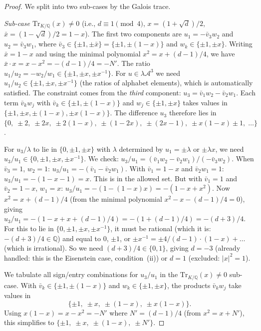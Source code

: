 \documentclass[12pt,a4paper]{article}
\newcommand{\Q}{\mathbb{Q}}
\newcommand{\Tr}[1]{\mathrm{Tr}_{K/\Q}\!\left(#1\right)}
\begin{document}
\begin{proof}
We split into two sub-cases by the Galois trace.

\emph{Sub-case $\Tr{x} \neq 0$} (i.e., $d \equiv 1 \pmod{4}$,
$x = (1{+}\sqrt{d})/2$, $\bar{x} = (1{-}\sqrt{d})/2 = 1 - x$).
The first two components are $u_1 = -\bar{v}_3 w_2$ and
$u_2 = \bar{v}_3 w_1$, where $\bar{v}_3 \in \{\pm 1, \pm\bar{x}\}
= \{\pm 1, \pm(1{-}x)\}$ and $w_k \in \{\pm 1, \pm x\}$.
Writing $\bar{x} = 1 - x$ and using the minimal polynomial
$x^2 = x + (d{-}1)/4$, we have $\bar{x} \cdot x = x - x^2
= -(d{-}1)/4 = -N'$.  The ratio $u_1/u_2 = -w_2/w_1 \in \{\pm 1, \pm x,
\pm x^{-1}\}$.  For $u \in \lambda\mathcal{A}^3$ we need
$u_1/u_2 \in \{\pm 1, \pm x, \pm x^{-1}\}$ (the ratios of alphabet
elements), which is automatically satisfied.  The constraint comes
from the \emph{third} component: $u_3 = \bar{v}_1 w_2 - \bar{v}_2
w_1$.  Each term $\bar{v}_k w_j$ with $\bar{v}_k \in \{\pm 1,
\pm(1{-}x)\}$ and $w_j \in \{\pm 1, \pm x\}$ takes values in
$\{\pm 1, \pm x, \pm(1{-}x), \pm x(1{-}x)\}$.
The difference $u_3$ therefore lies in
$\{0,\;\pm 2,\;\pm 2x,\;\pm 2(1{-}x),\;\pm(1{-}2x),\;
\pm(2x{-}1),\;\pm x(1{-}x) \pm 1,\;\ldots\}$.

For $u_3/\lambda$ to lie in $\{0, \pm 1, \pm x\}$ with $\lambda$
determined by $u_1 = \pm\lambda$ or $\pm\lambda x$, we need
$u_3/u_1 \in \{0, \pm 1, \pm x, \pm x^{-1}\}$.  We check:
$u_3/u_1 = (\bar{v}_1 w_2 - \bar{v}_2 w_1)/(-\bar{v}_3 w_2)$.
When $\bar{v}_3 = 1$, $w_2 = 1$: $u_3/u_1 = -(\bar{v}_1 -
\bar{v}_2 w_1)$.  With $\bar{v}_1 = 1{-}x$ and $\bar{v}_2 w_1 = 1$:
$u_3/u_1 = -(1{-}x{-}1) = x$.  This is in the allowed set.
But with $\bar{v}_1 = 1$ and $\bar{v}_2 = 1{-}x$, $w_1 = x$:
$u_3/u_1 = -(1 - (1{-}x)x) = -(1 - x + x^2)$.  Now
$x^2 = x + (d{-}1)/4$ (from the minimal polynomial
$x^2 - x - (d{-}1)/4 = 0$), giving
$u_3/u_1 = -(1 - x + x + (d{-}1)/4) = -(1 + (d{-}1)/4) =
-(d{+}3)/4$.  For this to lie in $\{0, \pm 1, \pm x, \pm x^{-1}\}$,
it must be rational (which it is: $-(d{+}3)/4 \in \Q$) and equal
to $0$, $\pm 1$, or $\pm x^{-1} = \pm 4/(d{-}1) \cdot (1{-}x)
+ \ldots$ (which is irrational).  So we need $(d{+}3)/4 \in \{0, 1\}$,
giving $d = -3$ (already handled: this is the Eisenstein case,
condition~(ii)) or $d = 1$ (excluded: $|x|^2 = 1$).

We tabulate all sign/entry combinations for $u_3/u_1$ in the
$\Tr{x} \neq 0$ sub-case.  With
$\bar{v}_k \in \{\pm 1, \pm(1{-}x)\}$ and
$w_k \in \{\pm 1, \pm x\}$, the products $\bar{v}_k w_j$
take values in
\[
  \{\pm 1,\; \pm x,\; \pm(1{-}x),\; \pm x(1{-}x)\}.
\]
Using $x(1{-}x) = x - x^2 = -N'$ where $N' = (d{-}1)/4$
(from $x^2 = x + N'$), this simplifies to
$\{\pm 1,\; \pm x,\; \pm(1{-}x),\; \pm N'\}$.


\end{proof}
\end{document}
